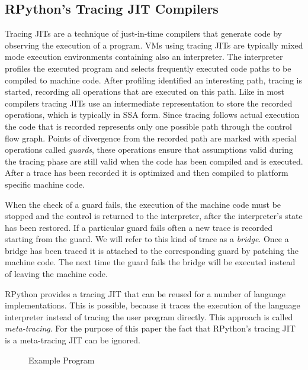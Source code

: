 \documentclass[10pt,preprint]{sigplanconf}
\begin{document}
\subsection{RPython's Tracing JIT Compilers}
\label{sub:tracing}
Tracing JITs are a technique of just-in-time compilers that generate code by
observing the execution of a program. VMs using tracing JITs are typically
mixed mode execution environments containing also an interpreter. The
interpreter profiles the executed program and selects frequently executed code
paths to be compiled to machine code. After profiling identified an interesting
path, tracing is started, recording all operations that are executed on this
path. Like in most compilers tracing JITs use an intermediate representation
to store the recorded operations, which is typically in SSA form. Since tracing follows actual execution the code that is recorded
represents only one possible path through the control flow graph. Points of
divergence from the recorded path are marked with special operations called
\emph{guards}, these operations ensure that assumptions valid during the
tracing phase are still valid when the code has been compiled and is executed.
After a trace has been recorded it is optimized and then compiled to platform
specific machine code.

When the check of a guard fails, the execution of the machine code must be
stopped and the control is returned to the interpreter, after the interpreter's
state has been restored. If a particular guard fails often a new trace is
recorded starting from the guard. We will refer to this kind of trace as a
\emph{bridge}. Once a bridge has been traced it is attached to the
corresponding guard by patching the machine code. The next time the guard fails
the bridge will be executed instead of leaving the machine code.

RPython provides a tracing JIT that can be reused for a number of language
implementations. This is possible, because it traces the execution of the
language interpreter instead of tracing the user program directly. This
approach is called \emph{meta-tracing}. For the purpose of this paper the fact
that RPython's tracing JIT is a meta-tracing JIT can be ignored.


\begin{figure}
    
    \caption{Example Program}
    \label{fig:trace-log}
\end{figure}
\end{document}
